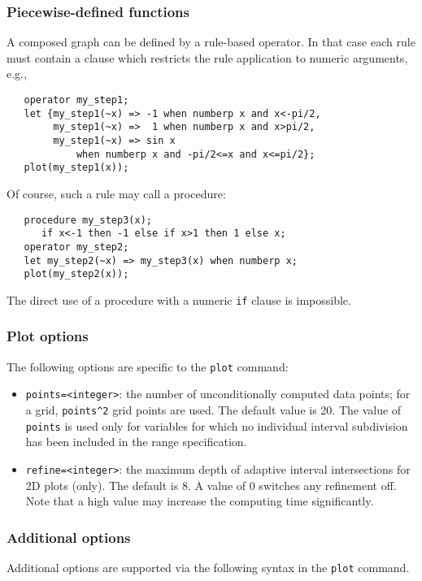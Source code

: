 \subsubsection{Piecewise-defined functions}
A composed graph can be defined by a rule-based operator.  In that case each
rule must contain a clause which restricts the rule application to numeric
arguments, e.g.,
\begin{verbatim}
   operator my_step1;
   let {my_step1(~x) => -1 when numberp x and x<-pi/2,
        my_step1(~x) =>  1 when numberp x and x>pi/2,
        my_step1(~x) => sin x
            when numberp x and -pi/2<=x and x<=pi/2};
   plot(my_step1(x));
\end{verbatim}
Of course, such a rule may call a procedure:
\begin{verbatim}
   procedure my_step3(x);
      if x<-1 then -1 else if x>1 then 1 else x;
   operator my_step2;
   let my_step2(~x) => my_step3(x) when numberp x;
   plot(my_step2(x));
\end{verbatim}
The direct use of a procedure with a numeric \texttt{if} clause is impossible.

\subsubsection{Plot options}
\label{gnuplot:plot-options}
The following options are specific to the {\REDUCE} \texttt{plot} command:
\begin{itemize}
   \item \texttt{points=<integer>}: the number of unconditionally
     computed data points; for a grid,
     \texttt{points\textasciicircum2} grid points are used.  The
     default value is 20.  The value of \texttt{points} is used only
     for variables for which no individual interval subdivision has
     been included in the range specification.
   \item \texttt{refine=<integer>}: the maximum depth of adaptive
     interval intersections for 2D plots (only).  The default is 8.  A
     value of 0 switches any refinement off.  Note that a high value
     may increase the computing time significantly.
\end{itemize}

\subsubsection{Additional options}

Additional {\Gnuplot} options are supported via the following
syntax in the \texttt{plot} command.

